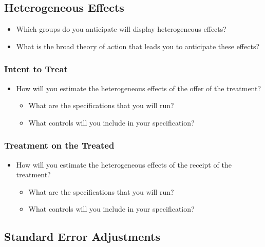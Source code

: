 \documentclass[12pt]{article}
\begin{document}
\subsection{Heterogeneous Effects}

\begin{itemize}
\item Which groups do you anticipate will display heterogeneous effects?
\item What is the broad theory of action that leads you to anticipate these effects? 
\end{itemize}

\subsubsection{Intent to Treat}

\begin{itemize}
\item How will you estimate the heterogeneous effects of the offer of the treatment? 
\begin{itemize}
\item What are the specifications that you will run?
\item What controls will you include in your specification?
\end{itemize}
\end{itemize}

\subsubsection{Treatment on the Treated}

\begin{itemize}
\item How will you estimate the heterogeneous effects of the receipt of the treatment? 
\begin{itemize}
\item What are the specifications that you will run?
\item What controls will you include in your specification?
\end{itemize}
\end{itemize}

\subsection{Standard Error Adjustments}
\end{document}
